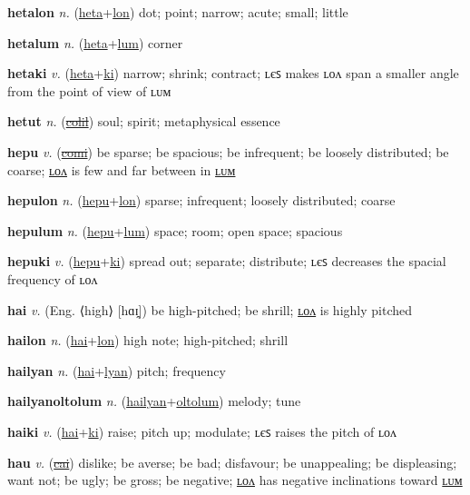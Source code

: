 \textbf{\hypertarget{hetalon}{hetalon}} \textit{n.} (\hyperlink{heta}{heta}+\allowbreak \hyperlink{lon}{lon})
dot; point; narrow; acute; small; little

\textbf{\hypertarget{hetalum}{hetalum}} \textit{n.} (\hyperlink{heta}{heta}+\allowbreak \hyperlink{lum}{lum})
corner

\textbf{\hypertarget{hetaki}{hetaki}} \textit{v.} (\hyperlink{heta}{heta}+\allowbreak \hyperlink{ki}{ki})
narrow; shrink; contract; ʟєꜱ makes ʟᴏᴧ span a smaller angle from the point of view of ʟᴜᴍ

\textbf{\hypertarget{hetut}{hetut}} \textit{n.} (\hyperlink{colil}{\sout{colil}})
soul; spirit; metaphysical essence

\textbf{\hypertarget{hepu}{hepu}} \textit{v.} (\hyperlink{comi}{\sout{comi}})
be sparse; be spacious; be infrequent; be loosely distributed; be coarse; \hyperlink{hepulon}{ʟᴏᴧ} is few and far between in \hyperlink{hepulum}{ʟᴜᴍ}

\textbf{\hypertarget{hepulon}{hepulon}} \textit{n.} (\hyperlink{hepu}{hepu}+\allowbreak \hyperlink{lon}{lon})
sparse; infrequent; loosely distributed; coarse

\textbf{\hypertarget{hepulum}{hepulum}} \textit{n.} (\hyperlink{hepu}{hepu}+\allowbreak \hyperlink{lum}{lum})
space; room; open space; spacious

\textbf{\hypertarget{hepuki}{hepuki}} \textit{v.} (\hyperlink{hepu}{hepu}+\allowbreak \hyperlink{ki}{ki})
spread out; separate; distribute; ʟєꜱ decreases the spacial frequency of ʟᴏᴧ

\textbf{\hypertarget{hai}{hai}} \textit{v.} (Eng. ⟨high⟩ [hɑɪ̯])
be high-pitched; be shrill; \hyperlink{hailon}{ʟᴏᴧ} is highly pitched

\textbf{\hypertarget{hailon}{hailon}} \textit{n.} (\hyperlink{hai}{hai}+\allowbreak \hyperlink{lon}{lon})
high note; high-pitched; shrill

\textbf{\hypertarget{hailyan}{hailyan}} \textit{n.} (\hyperlink{hai}{hai}+\allowbreak \hyperlink{lyan}{lyan})
pitch; frequency

\textbf{\hypertarget{hailyanoltolum}{hailyanoltolum}} \textit{n.} (\hyperlink{hailyan}{hailyan}+\allowbreak \hyperlink{oltolum}{oltolum})
melody; tune

\textbf{\hypertarget{haiki}{haiki}} \textit{v.} (\hyperlink{hai}{hai}+\allowbreak \hyperlink{ki}{ki})
raise; pitch up; modulate; ʟєꜱ raises the pitch of ʟᴏᴧ

\textbf{\hypertarget{hau}{hau}} \textit{v.} (\hyperlink{cai}{\sout{cai}})
dislike; be averse; be bad; disfavour; be unappealing; be displeasing; want not; be ugly; be gross; be negative; \hyperlink{haulon}{ʟᴏᴧ} has negative inclinations toward \hyperlink{haulum}{ʟᴜᴍ}

